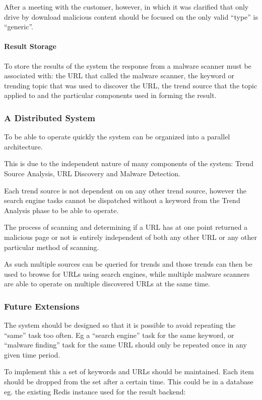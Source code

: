 After a meeting with the customer, however, in which it was clarified that only drive by download malicious content should be focused on the only valid ``type'' is ``generic''.

\paragraph{Result Storage}
To store the results of the system the response from a malware scanner must be associated with: the URL that called the malware scanner, the keyword or trending topic that was used to discover the URL, the trend source that the topic applied to and the particular components used in forming the result.

\subsubsection{A Distributed System}
To be able to operate quickly the system can be organized into a parallel architecture.

This is due to the independent nature of many components of the system: Trend Source Analysis, URL Discovery and Malware Detection.

Each trend source is not dependent on on any other trend source, however the search engine tasks cannot be dispatched without a keyword from the Trend Analysis phase to be able to operate.

The process of scanning and determining if a URL has at one point returned a malicious page or not is entirely independent of both any other URL or any other particular method of scanning.

As such multiple sources can be queried for trends and those trends can then be used to browse for URLs using search engines, while multiple malware scanners are able to operate on multiple discovered URLs at the same time.

\subsubsection{Future Extensions}
The system should be designed so that it is possible to avoid repeating the ``same'' task too often. Eg a ``search engine'' task for the same keyword, or ``malware finding'' task for the same URL should only be repeated once in any given time period.

To implement this a set of keywords and URLs should be maintained. Each item should be dropped from the set after a certain time. This could be in a database eg. the existing Redis instance used for the result backend:

